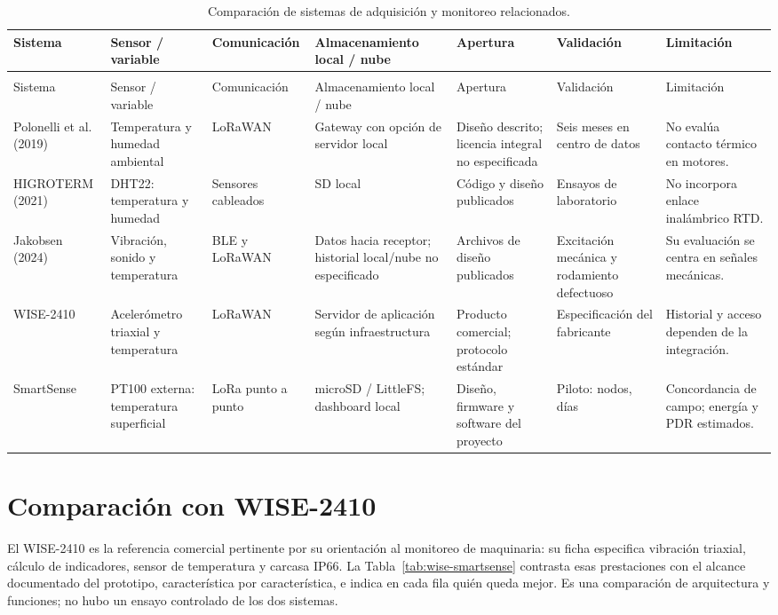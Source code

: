 \begingroup
\small
{}
\setlength{\tabcolsep}{3pt}
\begin{longtable}{@{}>{\raggedright\arraybackslash}p{2.1cm}>{\raggedright\arraybackslash}p{2cm}>{\raggedright\arraybackslash}p{2.1cm}>{\raggedright\arraybackslash}p{2.4cm}>{\raggedright\arraybackslash}p{1.7cm}>{\raggedright\arraybackslash}p{2.2cm}>{\raggedright\arraybackslash}p{2.25cm}@{}}
\caption{Comparación de sistemas de adquisición y monitoreo relacionados.}\label{tab:estado-arte-comparacion}\\
\toprule
Sistema & Sensor / variable & Comunicación & Almacenamiento local / nube & Apertura & Validación & Limitación \\
\midrule
\endfirsthead
\multicolumn{7}{l}{Tabla~\thetable{} (continuación)}\\
\toprule
Sistema & Sensor / variable & Comunicación & Almacenamiento local / nube & Apertura & Validación & Limitación \\
\midrule
\endhead
\bottomrule
\endfoot
Polonelli et al. (2019) & Temperatura y humedad ambiental & LoRaWAN & Gateway con opción de servidor local & Diseño descrito; licencia integral no especificada & Seis meses en centro de datos & No evalúa contacto térmico en motores. \\
\addlinespace
HIGROTERM (2021) & DHT22: temperatura y humedad & Sensores cableados & SD local & Código y diseño publicados & Ensayos de laboratorio & No incorpora enlace inalámbrico RTD. \\
\addlinespace
Jakobsen (2024) & Vibración, sonido y temperatura & BLE y LoRaWAN & Datos hacia receptor; historial local/nube no especificado & Archivos de diseño publicados & Excitación mecánica y rodamiento defectuoso & Su evaluación se centra en señales mecánicas. \\
\addlinespace
WISE-2410 & Acelerómetro triaxial y temperatura & LoRaWAN & Servidor de aplicación según infraestructura & Producto comercial; protocolo estándar & Especificación del fabricante & Historial y acceso dependen de la integración. \\
\addlinespace
SmartSense & PT100 externa: temperatura superficial & LoRa punto a punto & microSD / LittleFS; dashboard local & Diseño, firmware y software del proyecto & Piloto: \NumeroNodos{} nodos, \DuracionComunDias{} días & Concordancia de campo; energía y PDR estimados. \\
\end{longtable}
\endgroup

\section{Comparación con WISE-2410}
El WISE-2410 es la referencia comercial pertinente por su orientación al monitoreo de maquinaria: su ficha \citep{wise2410} especifica vibración triaxial, cálculo de indicadores, sensor de temperatura y carcasa IP66. La Tabla~\ref{tab:wise-smartsense} contrasta esas prestaciones con el alcance documentado del prototipo, característica por característica, e indica en cada fila quién queda mejor. Es una comparación de arquitectura y funciones; no hubo un ensayo controlado de los dos sistemas.

